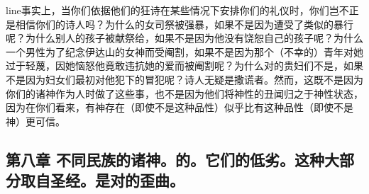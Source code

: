 line{}事实上，当你们依据他们的狂诗在某些情况下安排你们的礼仪时，你们岂不正是相信你们的诗人吗？\newline{}为什么的女司祭被强暴，如果不是因为遭受了类似的暴行呢？\newline{}为什么别人的孩子被献祭给，如果不是因为他没有饶恕自己的孩子呢？\newline{}为什么一个男性为了纪念伊达山的女神而受阉割，如果不是因为那个（不幸的）青年对她过于轻蔑，因她恼怒他竟敢违抗她的爱而被阉割呢？\newline{}为什么对的贵妇们不是，如果不是因为妇女们最初对他犯下的冒犯呢？\newline{}诗人无疑是撒谎者。然而，这既不是因为你们的诸神作为人时做了这些事，也不是因为他们将神性的丑闻归之于神性状态，因为在你们看来，有神存在（即使不是这种品性）似乎比有这种品性（即使不是神）更可信。\par


\subsection{第八章 不同民族的诸神。的。它们的低劣。这种大部分取自圣经。是对的歪曲。}

